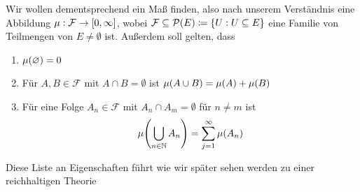 \begin{bemerkung}
    Wir wollen dementsprechend ein Maß finden, also nach unserem Verständnis eine Abbildung $\mu: \mathcal{F} \to \left[0, \infty\right]$, wobei $\mathcal{F} \subseteq \mathcal{P}\of{E} \coloneqq \set{U: U \subseteq E}$ eine Familie von Teilmengen von $E\neq\emptyset$ ist. Außerdem soll gelten, dass

    \begin{enumerate}[label=(\roman*)]
        \item $\mu\of{\emptyset} = 0$
        \item Für $A, B\in\mathcal{F}$ mit $A\cap B = \emptyset$ ist $\mu\of{A \cup B} = \mu\of{A} + \mu\of{B}$
        \item Für eine Folge $A_n \in \mathcal{F}$ mit $A_n \cap A_m = \emptyset$ für $n\neq m$ ist
        \begin{align*}
            \mu\of{\dsty\bigcup_{n\in\N} A_n} = \sum_{j=1}^{\infty} \mu\of{A_n}
        \end{align*}
    \end{enumerate}
    Diese Liste an Eigenschaften führt wie wir später sehen werden zu einer reichhaltigen Theorie
\end{bemerkung}


\newpage